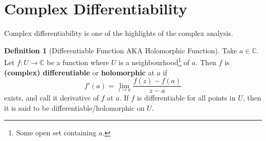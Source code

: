 \documentclass[a4paper, 12pt]{article}
\theoremstyle{definition}
\newtheorem{definition}{Definition}
\numberwithin{theorem}{section}
\numberwithin{definition}{section}
\numberwithin{exercise}{section}
\numberwithin{remark}{section}
\numberwithin{figure}{section}
\numberwithin{example}{section}
\newcommand{\C}{\mathbb{C}}
\begin{document}
\section{Complex Differentiability}
Complex differentiability is one of the highlights of the complex analysis.
\begin{definition}[Differentiable Function AKA Holomorphic Function]
    Take $a \in \C$.
    Let $f:U \rightarrow \C$ be a function where $U$ is a neighbourhood\footnote{Some open set containing $a$.} of $a$.
    Then $f$ is \textbf{(complex) differentiable} or \textbf{holomorphic} at $a$ if
    \begin{equation*}
        f'(a) = \lim_{z \rightarrow a} \frac{f(z) - f(a)}{z - a}
    \end{equation*}
    exists, and call it derivative of $f$ at $a$.
    If $f$ is differentiable for all points in $U$, then it is said to be
    differentiable/holomorphic on $U$.
\end{definition}
\end{document}
